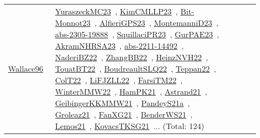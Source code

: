 {\begin{longtable}{lp{3cm}>{\raggedright\arraybackslash}p{6cm}>{\raggedright\arraybackslash}p{6cm}>{\raggedright\arraybackslash}p{8cm}}
\href{works/Wallace96.pdf}{Wallace96}~\cite{Wallace96} & \href{works/YuraszeckMC23.pdf}{YuraszeckMC23}~\cite{YuraszeckMC23}, \href{works/KimCMLLP23.pdf}{KimCMLLP23}~\cite{KimCMLLP23}, \href{works/Bit-Monnot23.pdf}{Bit-Monnot23}~\cite{Bit-Monnot23}, \href{works/AlfieriGPS23.pdf}{AlfieriGPS23}~\cite{AlfieriGPS23}, \href{works/MontemanniD23.pdf}{MontemanniD23}~\cite{MontemanniD23}, \href{works/abs-2305-19888.pdf}{abs-2305-19888}~\cite{abs-2305-19888}, \href{works/SquillaciPR23.pdf}{SquillaciPR23}~\cite{SquillaciPR23}, \href{works/GurPAE23.pdf}{GurPAE23}~\cite{GurPAE23}, \href{works/AkramNHRSA23.pdf}{AkramNHRSA23}~\cite{AkramNHRSA23}, \href{works/abs-2211-14492.pdf}{abs-2211-14492}~\cite{abs-2211-14492}, \href{works/NaderiBZ22.pdf}{NaderiBZ22}~\cite{NaderiBZ22}, \href{works/ZhangBB22.pdf}{ZhangBB22}~\cite{ZhangBB22}, \href{works/HeinzNVH22.pdf}{HeinzNVH22}~\cite{HeinzNVH22}, \href{works/TouatBT22.pdf}{TouatBT22}~\cite{TouatBT22}, \href{works/BoudreaultSLQ22.pdf}{BoudreaultSLQ22}~\cite{BoudreaultSLQ22}, \href{works/Teppan22.pdf}{Teppan22}~\cite{Teppan22}, \href{works/ColT22.pdf}{ColT22}~\cite{ColT22}, \href{works/LiFJZLL22.pdf}{LiFJZLL22}~\cite{LiFJZLL22}, \href{works/FarsiTM22.pdf}{FarsiTM22}~\cite{FarsiTM22}, \href{works/WinterMMW22.pdf}{WinterMMW22}~\cite{WinterMMW22}, \href{works/HamPK21.pdf}{HamPK21}~\cite{HamPK21}, \href{works/Astrand21.pdf}{Astrand21}~\cite{Astrand21}, \href{works/GeibingerKKMMW21.pdf}{GeibingerKKMMW21}~\cite{GeibingerKKMMW21}, \href{works/PandeyS21a.pdf}{PandeyS21a}~\cite{PandeyS21a}, \href{works/Groleaz21.pdf}{Groleaz21}~\cite{Groleaz21}, \href{works/FanXG21.pdf}{FanXG21}~\cite{FanXG21}, \href{works/BenderWS21.pdf}{BenderWS21}~\cite{BenderWS21}, \href{works/Lemos21.pdf}{Lemos21}~\cite{Lemos21}, \href{works/KovacsTKSG21.pdf}{KovacsTKSG21}~\cite{KovacsTKSG21}... (Total: 124)\\

\end{longtable}}
